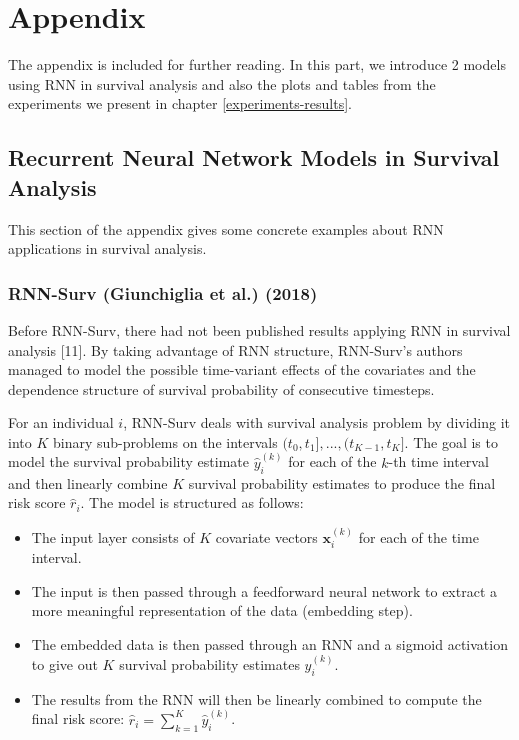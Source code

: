 \documentclass[
]{article}
\providecommand{\tightlist}{%
  \setlength{\itemsep}{0pt}\setlength{\parskip}{0pt}}
\begin{document}
\newpage

\appendix

\hypertarget{appendix}{%
\section{Appendix}\label{appendix}}

The appendix is included for further reading. In this part, we introduce 2 models using RNN in survival analysis and also the plots and tables from the experiments we present in chapter \ref{experiments-results}.

\hypertarget{recurrent-neural-network-models-in-survival-analysis}{%
\subsection{Recurrent Neural Network Models in Survival Analysis}\label{recurrent-neural-network-models-in-survival-analysis}}

This section of the appendix gives some concrete examples about RNN applications in survival analysis.

\hypertarget{rnn-surv-giunchiglia-et-al.-2018}{%
\subsubsection{RNN-Surv (Giunchiglia et al.) (2018)}\label{rnn-surv-giunchiglia-et-al.-2018}}

Before RNN-Surv, there had not been published results applying RNN in survival analysis {[}11{]}. By taking advantage of RNN structure, RNN-Surv's authors managed to model the possible time-variant effects of the covariates and the dependence structure of survival probability of consecutive timesteps.

For an individual \(i\), RNN-Surv deals with survival analysis problem by dividing it into \(K\) binary sub-problems on the intervals \((t_0,t_1],...,(t_{K-1},t_K]\). The goal is to model the survival probability estimate \(\hat{y}_i^{(k)}\) for each of the \(k\)-th time interval and then linearly combine \(K\) survival probability estimates to produce the final risk score \(\hat{r}_i\). The model is structured as follows:
\vspace{-0.5cm}

\begin{itemize}
\tightlist
\item
  The input layer consists of \(K\) covariate vectors \(\mathbf{x}_i^{(k)}\) for each of the time interval.
\item
  The input is then passed through a feedforward neural network to extract a more meaningful representation of the data (embedding step).
\item
  The embedded data is then passed through an RNN and a sigmoid activation to give out \(K\) survival probability estimates \(\hat{y}_i^{(k)}\).
\item
  The results from the RNN will then be linearly combined to compute the final risk score: \(\hat{r}_i = \sum_{k = 1}^{K} \hat{y}_i^{(k)}\).
\end{itemize}
\end{document}
